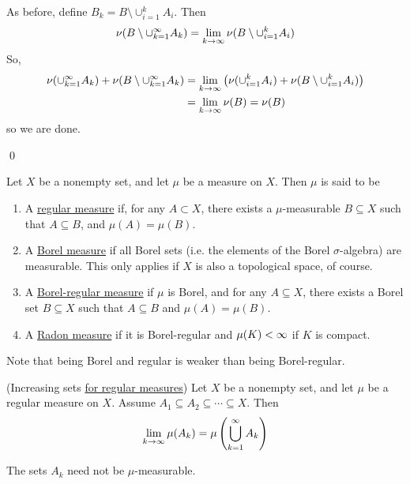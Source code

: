 \documentclass[x11names,reqno,14pt]{extarticle}
\newcommand{\seq}[2][\oo]{_{#2 = 1}^#1}
\newcommand{\bigcupk}[1][\oo]{\bigcup\seq[#1]{k}}
\begin{document}
As before, define $B_k = B\setminus \cup_{i=1}^kA_i$. Then
\[
\nu(B\setminus\cup\seq{k}A_k) = \lim_{k\to\oo}\nu(B\setminus\cup_{i=1}^kA_i)
\]
So, 
\begin{align*}
\nu(\cup\seq{k}A_k) + \nu(B\setminus\cup\seq{k}A_k) & = \lim_{k\to\oo}\left(\nu(\cup_{i=1}^kA_i) + \nu(B\setminus\cup_{i=1}^kA_i)\right) \\
& = \lim_{k\to\oo}\nu(B) = \nu(B) \\
\end{align*}
so we are done. 

\qed


Let $X$ be a nonempty set, and let $\mu$ be a measure on $X$. Then $\mu$ is said to be 
\begin{enumerate}
\item A \underline{regular measure} if, for any $A \subset X$, there exists a $\mu$-measurable $B\subseteq X$ such that $A \subseteq B$, and $\mu(A) = \mu(B)$. 
\item A \underline{Borel measure} if all Borel sets (i.e. the elements of the Borel $\sigma$-algebra) are measurable. This only applies if $X$ is also a topological space, of course. 
\item A \underline{Borel-regular measure} if $\mu$ is Borel, and for any $A \subseteq X$, there exists a Borel set $B \subseteq X$ such that $A \subseteq B$ and $\mu(A) = \mu(B)$. 
\item A \underline{Radon measure} if it is Borel-regular and $\mu(K)<\infty$ if $K$ is compact. 
\end{enumerate}

\rem

Note that being Borel and regular is weaker than being Borel-regular. 

\thm (Increasing sets \underline{for regular measures})
Let $X$ be a nonempty set, and let $\mu$ be a regular measure on $X$. Assume $A_1\subseteq A_2 \subseteq \cdots \subseteq X$. Then 
\[
\lim_{k\to\oo}\mu(A_k) = \mu\left(\bigcupk A_k\right)
\]

\rem The sets $A_k$ need not be $\mu$-measurable. 

\proof
\end{document}
